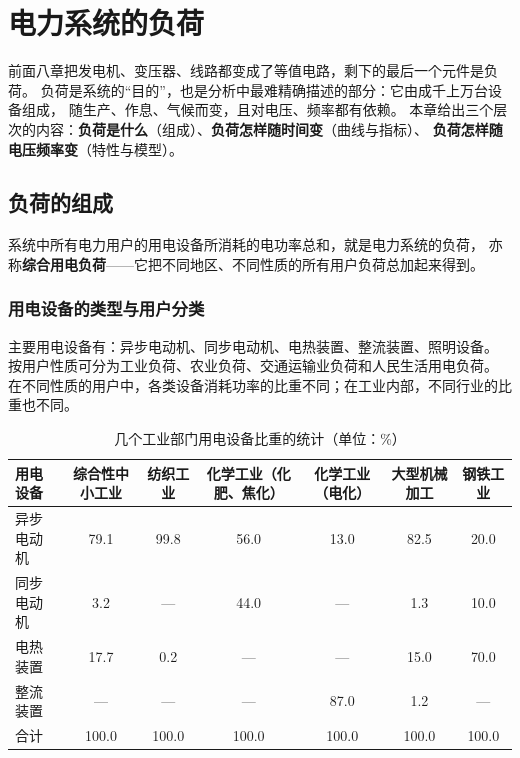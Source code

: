 
\chapter{电力系统的负荷}

前面八章把发电机、变压器、线路都变成了等值电路，剩下的最后一个元件是负荷。
负荷是系统的“目的”，也是分析中最难精确描述的部分：它由成千上万台设备组成，
随生产、作息、气候而变，且对电压、频率都有依赖。
本章给出三个层次的内容：\textbf{负荷是什么}（组成）、\textbf{负荷怎样随时间变}（曲线与指标）、
\textbf{负荷怎样随电压频率变}（特性与模型）。

\section{负荷的组成}

系统中所有电力用户的用电设备所消耗的电功率总和，就是电力系统的负荷，
亦称\textbf{综合用电负荷}——它把不同地区、不同性质的所有用户负荷总加起来得到。

\subsection{用电设备的类型与用户分类}

主要用电设备有：异步电动机、同步电动机、电热装置、整流装置、照明设备。
按用户性质可分为工业负荷、农业负荷、交通运输业负荷和人民生活用电负荷。
在不同性质的用户中，各类设备消耗功率的比重不同；在工业内部，不同行业的比重也不同。

\begin{table}[htbp]
  \centering
  \caption{几个工业部门用电设备比重的统计（单位：\%）}
  \small
  \begin{tabular}{@{}lcccccc@{}}
    \toprule
    用电设备 & 综合性中小工业 & 纺织工业 & 化学工业（化肥、焦化） & 化学工业（电化） & 大型机械加工 & 钢铁工业 \\
    \midrule
    异步电动机 & 79.1 & 99.8 & 56.0 & 13.0 & 82.5 & 20.0 \\
    同步电动机 & 3.2 & — & 44.0 & — & 1.3 & 10.0 \\
    电热装置 & 17.7 & 0.2 & — & — & 15.0 & 70.0 \\
    整流装置 & — & — & — & 87.0 & 1.2 & — \\
    \midrule
    合计 & 100.0 & 100.0 & 100.0 & 100.0 & 100.0 & 100.0 \\
    \bottomrule
  \end{tabular}
\end{table}

